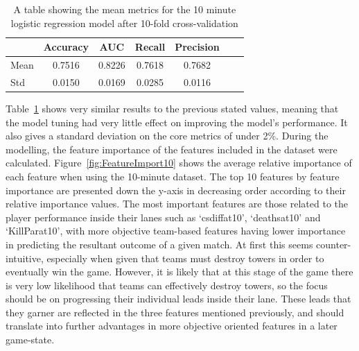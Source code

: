 \begin{table}[h]
    \centering
    \begin{tabular}{lcccccc}
        \toprule
        \textbf{} & \textbf{Accuracy} & \textbf{AUC} & \textbf{Recall} & \textbf{Precision} \\
        \midrule
        Mean & 0.7516 & 0.8226 & 0.7618 & 0.7682 \\
        Std & 0.0150 & 0.0169 & 0.0285 & 0.0116 \\
        \bottomrule
    \end{tabular}
    \caption{A table showing the mean metrics for the 10 minute logistic regression model after 10-fold cross-validation}
    \label{tab:Kfold10}
\end{table}

Table~\ref{tab:Kfold10} shows very similar results to the previous stated values, meaning that the model tuning had very little effect on improving the model's performance.
It also gives a standard deviation on the core metrics of under 2\%.
During the modelling, the feature importance of the features included in the dataset were calculated.
Figure~\ref{fig:FeatureImport10} shows the average relative importance of each feature when using the 10-minute dataset.
The top 10 features by feature importance are presented down the y-axis in decreasing order according to their relative importance values.
The most important features are those related to the player performance inside their lanes such as `csdiffat10', `deathsat10' and `KillParat10', with more objective team-based features having lower importance in predicting the resultant outcome of a given match.
At first this seems counter-intuitive, especially when given that teams must destroy towers in order to eventually win the game.
However, it is likely that at this stage of the game there is very low likelihood that teams can effectively destroy towers, so the focus should be on progressing their individual leads inside their lane.
These leads that they garner are reflected in the three features mentioned previously, and should translate into further advantages in more objective oriented features in a later game-state. \\

